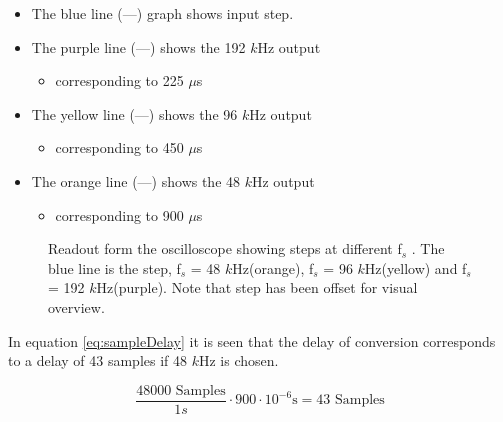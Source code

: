 \begin{itemize}
	\item The blue line (\textcolor{MATLABblue}{---}) graph shows input step.
	\item The purple line (\textcolor{MATLABpurple}{---}) shows the 192 $k$Hz output
	\begin{itemize}
		\item corresponding to 225 $\mu$s
	\end{itemize}
	\item The yellow line (\textcolor{MATLAByellow}{---}) shows the 96 $k$Hz output
	\begin{itemize}
		\item corresponding to 450 $\mu$s
	\end{itemize}
	\item The orange line (\textcolor{MATLABorange}{---}) shows the 48 $k$Hz output
	\begin{itemize}
		\item corresponding to 900 $\mu$s
	\end{itemize}
\end{itemize}
 

\begin{figure}[H]
	\centering
	
	\caption{Readout form the oscilloscope showing steps at different f$_s$ . The blue line is the step, f$_s$ = 48 $k$Hz(orange), f$_s$ = 96 $k$Hz(yellow) and f$_s$ = 192 $k$Hz(purple). Note that step has been offset for visual overview.}
	\label{fig:ScopeDelayExperiment}
\end{figure}

In equation \ref{eq:sampleDelay} it is seen that the delay of conversion corresponds to a delay of 43 samples if 48 $k$Hz is chosen.

\begin{equation}\label{eq:sampleDelay}
	\frac{48000\text{ Samples}}{1s} \cdot 900\cdot 10^{-6}\text{s} = 43 \text{ Samples} 
\end{equation}







